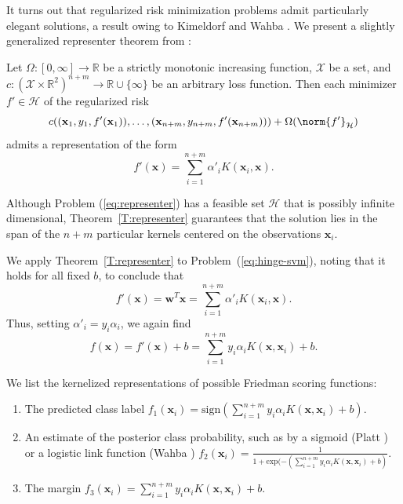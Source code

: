 It turns out that regularized risk minimization problems admit particularly elegant
solutions, a result owing to Kimeldorf and Wahba \cite{kimeldorf1971some}.  We
present a slightly generalized representer theorem from \cite{scholkopf2002learning}:
\begin{theorem}
  \label{T:representer}
  Let $\Omega:[0, \infty] \to \mathbb{R}$ be a strictly monotonic increasing function,
  $\mathcal{X}$ be a set, and $c: (\mathcal{X} \times \mathbb{R}^2)^{n+m} \to \mathbb{R} \cup \{\infty\}$
  be an arbitrary loss function.  Then each minimizer $f' \in \mathcal{H}$ of the regularized risk
  \begin{equation}
    \label{eq:representer}
    c((\mathbf{x}_1, y_1, f'(\mathbf{x}_1)), \ldots, (\mathbf{x}_{n+m}, y_{n+m}, f'(\mathbf{x}_{n+m}))) + \Omega(\norm{f'}_{\mathcal{H}})
  \end{equation}
  admits a representation of the form
  \begin{equation*}
    f'(\mathbf{x}) = \sum_{i=1}^{n+m} \alpha'_i K(\mathbf{x}_i, \mathbf{x}).
  \end{equation*}
\end{theorem}
Although Problem (\ref{eq:representer}) has a feasible set $\mathcal{H}$
that is possibly infinite dimensional, Theorem~\ref{T:representer} guarantees
that the solution lies in the span of the $n+m$ particular kernels centered
on the observations $\mathbf{x}_i$.

We apply Theorem~\ref{T:representer} to Problem~(\ref{eq:hinge-svm}), noting that it holds
for all fixed $b$, to conclude that
\begin{equation*}
  f'(\mathbf{x}) = \mathbf{w}^T\mathbf{x} = \sum_{i=1}^{n+m} \alpha'_i K(\mathbf{x}_i, \mathbf{x}).
\end{equation*}
Thus, setting $\alpha'_i = y_i \alpha_i$, we again find
\begin{equation*}
  f(\mathbf{x}) = f'(\mathbf{x}) + b = \sum_{i=1}^{n+m} y_i \alpha_i K(\mathbf{x}, \mathbf{x}_i) + b.
\end{equation*}

We list the kernelized representations of possible Friedman scoring functions:
\begin{enumerate}
\item The predicted class label $f_1(\mathbf{x}_i)
= \text{sign}(\sum_{i=1}^{n+m} y_i \alpha_i K(\mathbf{x}, \mathbf{x}_i) + b)$.
\item An estimate of the posterior class probability, such as by a
sigmoid (Platt \cite{platt1999probabilistic, lin2007note}) or a
logistic link function (Wahba \cite{wahba1992multivariate,
wahba1999support})
$f_2(\mathbf{x}_i) = \frac{1}{1 + \text{exp}(-(\sum_{i=1}^{n+m} y_i \alpha_i K(\mathbf{x}, \mathbf{x}_i) + b)}$.
\item The margin $f_3(\mathbf{x}_i) = \sum_{i=1}^{n+m} y_i \alpha_i K(\mathbf{x}, \mathbf{x}_i) + b$.
\end{enumerate}


